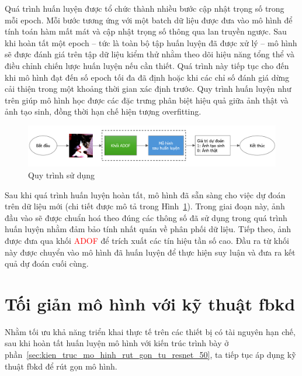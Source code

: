 Quá trình huấn luyện được tổ chức thành nhiều bước cập nhật trọng số trong mỗi \gls{epoch}. Mỗi bước tương ứng với một \gls{batch} dữ liệu được đưa vào mô hình để tính toán hàm mất mát và cập nhật trọng số thông qua lan truyền ngược. Sau khi hoàn tất một \gls{epoch} – tức là toàn bộ tập huấn luyện đã được xử lý – mô hình sẽ được đánh giá trên tập dữ liệu kiểm thử nhằm theo dõi hiệu năng tổng thể và điều chỉnh chiến lược huấn luyện nếu cần thiết. Quá trình này tiếp tục cho đến khi mô hình đạt đến số \gls{epoch} tối đa đã định hoặc khi các chỉ số đánh giá dừng cải thiện trong một khoảng thời gian xác định trước. Quy trình huấn luyện như trên giúp mô hình học được các đặc trưng phân biệt hiệu quả giữa ảnh thật và ảnh tạo sinh, đồng thời hạn chế hiện tượng \gls{overfitting}.
%
%
\begin{figure}[ht!]
	\centering
	\includegraphics[width=1.0\linewidth]{Images/online-serving.png}
	\begin{minipage}{1.0\linewidth}
		\vspace{3mm}
		\caption{Quy trình sử dụng}
		\label{fig:online-serving}
	\end{minipage}
\end{figure}
%
%

Sau khi quá trình huấn luyện hoàn tất, mô hình đã sẵn sàng cho việc dự đoán trên dữ liệu mới (chi tiết được mô tả trong Hình~\ref{fig:online-serving}). Trong giai đoạn này, ảnh đầu vào sẽ được chuẩn hoá theo đúng các thông số đã sử dụng trong quá trình huấn luyện nhằm đảm bảo tính nhất quán về phân phối dữ liệu. Tiếp theo, ảnh được đưa qua khối \textcolor{red}{ADOF} để trích xuất các tín hiệu tần số cao. Đầu ra từ khối này được chuyển vào mô hình đã huấn luyện để thực hiện suy luận và đưa ra kết quả dự đoán cuối cùng.

\section{Tối giản mô hình với kỹ thuật \gls{fbkd}}

Nhằm tối ưu khả năng triển khai thực tế trên các thiết bị có tài nguyên hạn chế, sau khi hoàn tất huấn luyện mô hình với kiến trúc trình bày ở phần~\ref{sec:kien_truc_mo_hinh_rut_gon_tu_resnet_50}, ta tiếp tục áp dụng kỹ thuật \gls{fbkd} để rút gọn mô hình.

